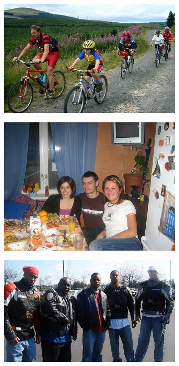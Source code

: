 \begin{figure}[h]
  \centering
  \begin{subfigure}{.25\textwidth}
    \includegraphics[width=1.\linewidth,height=0.618\linewidth]{figures/pascal_dataset/image-1.jpg}
  \end{subfigure}%
  \begin{subfigure}{.25\textwidth}
    \includegraphics[width=1.\linewidth,height=0.618\linewidth]{figures/pascal_dataset/image-2.jpg}
  \end{subfigure}%
  \begin{subfigure}{.25\textwidth}
    \includegraphics[width=1.\linewidth,height=0.618\linewidth]{figures/pascal_dataset/image-3.jpg}

\end{subfigure}
\end{figure}
